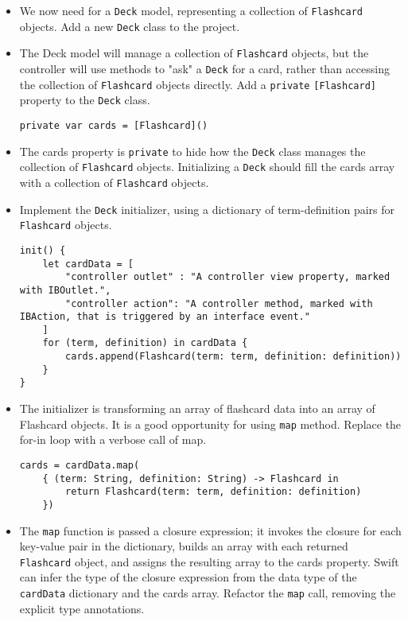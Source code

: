 \documentclass[a4paper,11pt]{scrartcl}
\begin{document}
\begin{itemize}
\item We now need for a \texttt{Deck} model, representing a collection of \texttt{Flashcard} objects. Add a new \texttt{Deck} class to the project.
\item The Deck model will manage a collection of \texttt{Flashcard} objects, but the controller will use methods to "ask" a \texttt{Deck} for a card, rather than accessing the collection of \texttt{Flashcard} objects directly. Add a \texttt{private} \texttt{[Flashcard]} property to the \texttt{Deck} class.
\begin{lstlisting}
private var cards = [Flashcard]()
\end{lstlisting}
\item The cards property is \texttt{private} to hide how the \texttt{Deck} class manages the collection of \texttt{Flashcard} objects. Initializing a \texttt{Deck} should fill the cards array with a collection of \texttt{Flashcard} objects.
\item Implement the \texttt{Deck} initializer, using a dictionary of term-definition pairs for \texttt{Flashcard} objects.
\begin{lstlisting}
init() {
	let cardData = [
		"controller outlet" : "A controller view property, marked with IBOutlet.",
		"controller action": "A controller method, marked with IBAction, that is triggered by an interface event."
	]
	for (term, definition) in cardData {
		cards.append(Flashcard(term: term, definition: definition))
	}
}
\end{lstlisting}
\item The initializer is transforming an array of flashcard data into an array of Flashcard objects. It is a good opportunity for using \texttt{map} method. Replace the for-in loop with a verbose call of map.
\begin{lstlisting}
cards = cardData.map(
	{ (term: String, definition: String) -> Flashcard in
		return Flashcard(term: term, definition: definition)
	})
\end{lstlisting}
\item The \texttt{map} function is passed a closure expression; it invokes the closure for each key-value pair in the dictionary, builds an array with each returned \texttt{Flashcard} object, and assigns the resulting array to the cards property. Swift can infer the type of the closure expression from the data type of the \texttt{cardData} dictionary and the cards array. Refactor the \texttt{map} call, removing the explicit type annotations.

\end{itemize}
\end{document}
